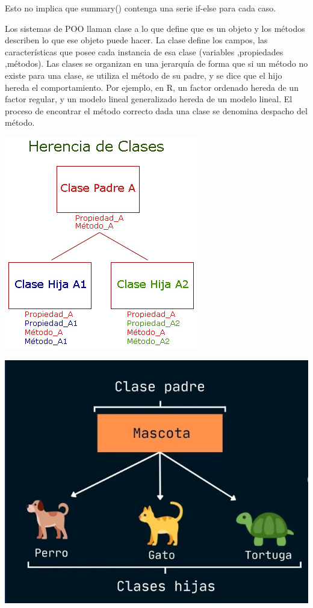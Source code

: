 \documentclass[
]{book}
\begin{document}
Esto no implica que summary() contenga una serie if-else para cada caso.

Los sistemas de POO llaman clase a lo que define que es un objeto y los métodos describen lo que ese objeto puede hacer. La clase define los campos, las características que posee cada instancia de esa clase (variables ,propiedades ,métodos). Las clases se organizan en una jerarquía de forma que si un método no existe para una clase, se utiliza el método de su padre, y se dice que el hijo hereda el comportamiento. Por ejemplo, en R, un factor ordenado hereda de un factor regular, y un modelo lineal generalizado hereda de un modelo lineal. El proceso de encontrar el método correcto dada una clase se denomina despacho del método.

\includegraphics{graficasR6/clasesherencia.jpg}

\includegraphics{graficasR6/ejemploherencia.jpg}
\end{document}

